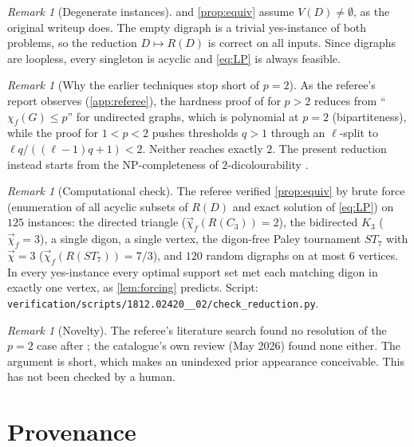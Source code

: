 \documentclass[11pt,a4paper]{article}
\theoremstyle{plain}
\theoremstyle{definition}
\theoremstyle{remark}
\newtheorem{remark}[theorem]{Remark}
\newcommand{\fdc}{\vec{\chi}_{f}}
\newcommand{\dic}{\vec{\chi}}
\begin{document}
\begin{remark}[Degenerate instances]\label{rem:empty}
 and \cref{prop:equiv} assume $V(D)\ne\emptyset$, as the original writeup does. The empty digraph is a trivial yes-instance of both problems, so the reduction $D\mapsto R(D)$ is correct on all inputs. Since digraphs are loopless, every singleton is acyclic and \eqref{eq:LP} is always feasible.
\end{remark}

\begin{remark}[Why the earlier techniques stop short of $p=2$]
As the referee's report observes (\cref{app:referee}), the hardness proof of \cite{HSS20} for $p>2$ reduces from ``$\chi_f(G)\le p$'' for undirected graphs, which is polynomial at $p=2$ (bipartiteness), while the proof for $1<p<2$ pushes thresholds $q>1$ through an $\ell$-split to $\ell q/((\ell-1)q+1)<2$. Neither reaches exactly $2$. The present reduction instead starts from the NP-completeness of $2$-dicolourability \cite{BFJKM04}.
\end{remark}

\begin{remark}[Computational check]
The referee verified \cref{prop:equiv} by brute force (enumeration of all acyclic subsets of $R(D)$ and exact solution of \eqref{eq:LP}) on $125$ instances: the directed triangle ($\fdc(R(C_3))=2$), the bidirected $K_3$ ($\fdc=3$), a single digon, a single vertex, the digon-free Paley tournament $ST_7$ with $\dic=3$ ($\fdc(R(ST_7))=7/3$), and $120$ random digraphs on at most $6$ vertices. In every yes-instance every optimal support set met each matching digon in exactly one vertex, as \cref{lem:forcing} predicts. Script: \texttt{verification/scripts/1812.02420\_\_02/check\_reduction.py}.
\end{remark}

\begin{remark}[Novelty]
The referee's literature search found no resolution of the $p=2$ case after \cite{HSS20}; the catalogue's own review (May 2026) found none either. The argument is short, which makes an unindexed prior appearance conceivable. This has not been checked by a human.
\end{remark}

\section{Provenance}\label{sec:provenance}
\end{document}
